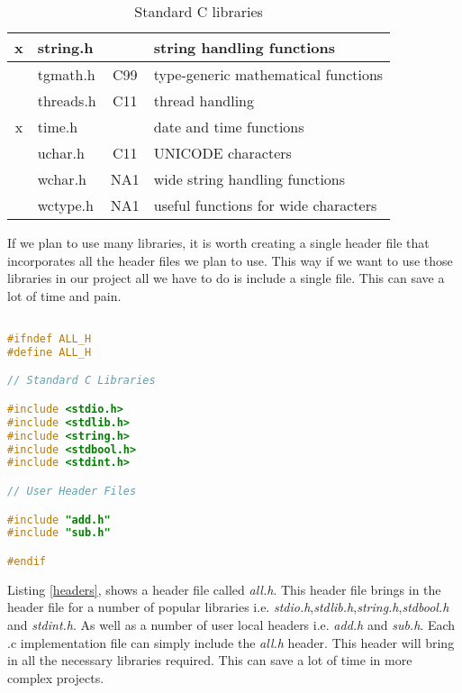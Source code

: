 \begin{table}
\begin{tabular}{ | c | l | c | l |}
    x          & string.h &  & string handling functions \\ \hline
               & tgmath.h & C99 & type-generic mathematical functions \\ \hline
               & threads.h & C11 & thread handling \\ \hline
    x		   & time.h &  & date and time functions \\ \hline
               & uchar.h & C11 & UNICODE characters \\ \hline
               & wchar.h & NA1 & wide string handling functions \\ \hline
               & wctype.h & NA1 & useful functions for wide characters \\ \hline   
  \end{tabular}
\caption{Standard C libraries}
\label{Table:StandardLibraries}
\end{table}

If we plan to use many libraries, it is worth creating a single header file that incorporates all the header files we plan to use. This way if we want to use those libraries in our project all we have to do is include a single file. This can save a lot of time and pain.

\begin{lstlisting}[language=C,caption={File all.h, universal header file},captionpos=b,label=headers]  

#ifndef ALL_H
#define ALL_H

// Standard C Libraries

#include <stdio.h>
#include <stdlib.h>
#include <string.h>
#include <stdbool.h>
#include <stdint.h>

// User Header Files

#include "add.h"
#include "sub.h"

#endif
\end{lstlisting}

Listing \ref{headers}, shows a header file called \textit{all.h}. This header file brings in the header file for a number of popular libraries i.e. \textit{stdio.h},\textit{stdlib.h},\textit{string.h},\textit{stdbool.h} and \textit{stdint.h}. As well as a number of user local headers i.e. \textit{add.h} and \textit{sub.h}. Each .c implementation file can simply include the \textit{all.h} header. This header will bring in all the necessary libraries required. This can save a lot of time in more complex projects.

